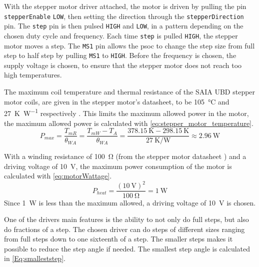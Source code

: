 With the stepper motor driver attached, the motor is driven by pulling the pin \texttt{stepperEnable} \texttt{LOW}, then setting the direction through the \texttt{stepperDirection} pin. The \texttt{step} pin is then pulsed \texttt{HIGH} and \texttt{LOW}, in a pattern depending on the chosen duty cycle and frequency. Each time \texttt{step} is pulled \texttt{HIGH}, the stepper motor moves a step. The \texttt{MS1} pin allows the \gls{psoc} to change the step size from full step to half step by pulling \texttt{MS1} to \texttt{HIGH}. Before the frequency is chosen, the supply voltage is chosen, to ensure that the stepper motor does not reach too high temperatures.

The maximum coil temperature and thermal resistance of the SAIA UBD stepper motor coils, are given in the stepper motor's datasheet, to be \SI{105}{\degreeCelsius} and \SI{27}{\kelvin\per\watt} respectively \cite{SAIAstep}. This limits the maximum allowed power in the motor, the maximum allowed power is calculated with \autoref{eq:stepper_motor_temperature}.
\begin{equation} \label{eq:stepper_motor_temperature}
	P_{max} =\frac{T_{mR}}{\theta_{WA}} = \frac{T_{mW}-T_{A}}{\theta_{WA}} = \frac{\SI{378,15}{\kelvin} - \SI{298,15}{\kelvin}}{\SI{27}{\kelvin\per\watt}} \approx \SI{2,96}{\watt}
\end{equation}
\startexplain
\stopexplain

With a winding resistance of \SI{100}{\ohm} (from the stepper motor datasheet \cite{SAIAstep}) and a driving voltage of \SI{10}{\volt}, the maximum power consumption of the motor is calculated with \autoref{eq:motorWattage}. 
\begin{equation}\label{eq:motorWattage}
P_{heat}=\frac{(\SI{10}{\volt})^2}{\SI{100}{\ohm}} = \SI{1}{\watt}
\end{equation}
Since \SI{1}{\watt} is less than the maximum allowed, a driving voltage of \SI{10}{\volt} is chosen. 

One of the drivers main features is the ability to not only do full steps, but also do fractions of a step. The chosen driver can do steps of different sizes ranging from full steps down to one sixteenth of a step. The smaller steps makes it possible to reduce the step angle if needed. The smallest step angle is calculated in \autoref{Eq:smalleststep}.

